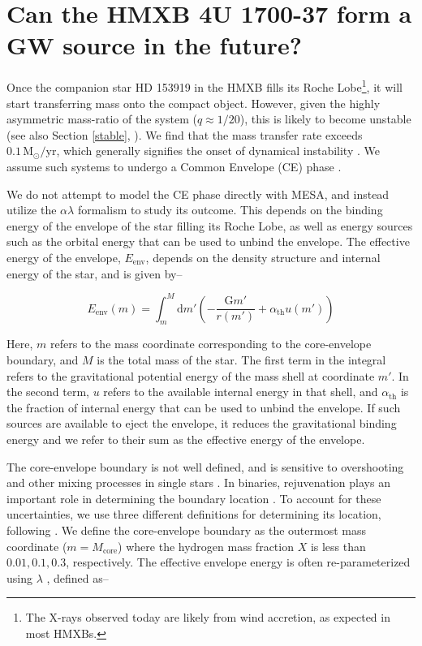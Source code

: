 \documentclass[linenumbers,trackchanges,twocolumn]{aastex701}
\newcommand{\Mdot}{\mathrm{M}_{\odot}}
\begin{document}
\section{Can the HMXB 4U 1700-37 form a GW source in the future?} \label{xrb-future}

Once the companion star HD 153919 in the HMXB fills its Roche Lobe\footnote{The X-rays observed today are likely from wind accretion, as expected in most HMXBs.}, it will start transferring mass onto the compact object. However, given the highly asymmetric mass-ratio of the system ($q \approx 1/20$), this is likely to become unstable (see also Section \ref{stable}, \citealp{2019A&A...628A..19Q, 2025arXiv251110728O}). We find that the mass transfer rate exceeds $0.1 \, \Mdot/\mathrm{yr}$, which generally signifies the onset of dynamical instability \citep{2025arXiv251009745K}. We assume such systems to undergo a Common Envelope (CE) phase \citep{2023ApJS..264...45F}.

We do not attempt to model the CE phase directly with \textsc{MESA}, and instead utilize the $\alpha \lambda$ formalism \citep{webbink:84,1990ApJ...358..189D} to study its outcome. This depends on the binding energy of the envelope of the star filling its Roche Lobe, as well as energy sources such as the orbital energy that can be used to unbind the envelope. The effective energy of the envelope, $E_{\text{env}}$, depends on the density structure and internal energy of the star, and is given by--

\begin{equation}\label{eq:BE_def}
    E_{\text{env}}(m) = \int_m^M \text{d}m' \left(-\frac{\text{G}m'}{r(m')} + \alpha_{\text{th}}u(m')\right)
\end{equation}

Here, $m$ refers to the mass coordinate corresponding to the
core-envelope boundary, and $M$ is the total mass of the star. The
first term in the integral refers to the gravitational potential
energy of the mass shell at coordinate $m'$. In the second term, $u$ refers to the available internal energy in that shell, and $\alpha_{\text{th}}$ is the fraction of internal energy that can be used to unbind the envelope. If such sources are available to eject the envelope, it reduces the gravitational binding energy and we refer to their sum as the effective energy of the envelope.

The core-envelope boundary is not well defined, and is sensitive to overshooting and other mixing processes in single stars \citep[e.g.,][]{2020cee..book.....I}. In binaries, rejuvenation plays an important role in determining the boundary location \citep{2023ApJ...942L..32R,2025ApJ...979...57L}. To account for these uncertainties, we use three different definitions for determining its location, following \cite{2023ApJS..264...45F}. We define the core-envelope boundary as the outermost mass coordinate ($m = M_{\text{core}}$) where the hydrogen mass fraction $X$ is less than $0.01,0.1,0.3$, respectively. The effective envelope energy is often re-parameterized
using $\lambda$ \citep{1990ApJ...358..189D}, defined as--
\end{document}

